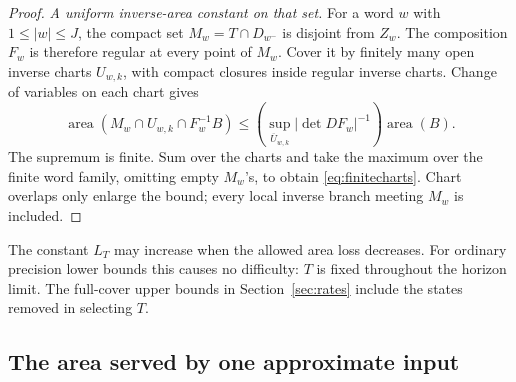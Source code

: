 \documentclass[11pt]{amsart}
\theoremstyle{definition}
\theoremstyle{remark}
\newcommand{\area}{\operatorname{area}}
\numberwithin{equation}{section}
\begin{document}
\begin{proof}
\smallskip
\emph{A uniform inverse-area constant on that set.}
For a word \(w\) with \(1\le|w|\le J\), the compact set
\(M_w=T\cap D_{w^-}\) is disjoint from \(Z_w\).
The composition \(F_w\) is therefore regular at every point of
\(M_w\). Cover it by finitely many open inverse charts \(U_{w,k}\),
with compact closures inside regular inverse charts. Change of
variables on each chart gives
\[
\area(M_w\cap U_{w,k}\cap F_w^{-1}B)
\le
\left(\sup_{\overline U_{w,k}}|\det DF_w|^{-1}\right)\area(B).
\]
The supremum is finite. Sum over the charts and take the maximum
over the finite word family, omitting empty \(M_w\)'s, to obtain
\eqref{eq:finitecharts}. Chart overlaps only enlarge the bound;
every local inverse branch meeting \(M_w\) is included.
\end{proof}

The constant $L_T$ may increase when the allowed area loss decreases.
For ordinary precision lower bounds this causes no difficulty:
$T$ is fixed throughout the horizon limit. The full-cover upper
bounds in Section~\ref{sec:rates} include the states removed
in selecting $T$.

\subsection{The area served by one approximate input}
\end{document}
